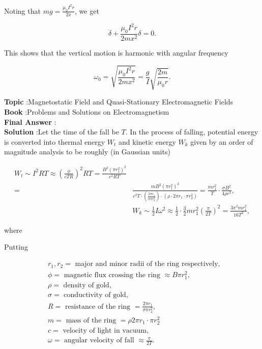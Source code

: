 \documentclass[10pt]{article}
\begin{document}
Noting that $m g=\frac{\mu_{0} I^{2} r}{2 x}$, we get

$$
\ddot{\delta}+\frac{\mu_{0} I^{2} r}{2 m x^{2}} \delta=0 .
$$

This shows that the vertical motion is harmonic with angular frequency

$$
\omega_{0}=\sqrt{\frac{\mu_{0} I^{2} r}{2 m x^{2}}}=\frac{g}{I} \sqrt{\frac{2 m}{\mu_{0} r}} .
$$

\textbf{Topic} :Magnetostatic Field and Quasi-Stationary Electromagnetic Fields\\
\textbf{Book} :Problems and Solutions on Electromagnetism\\
\textbf{Final Answer} : \\


\textbf{Solution} :Let the time of the fall be $T$. In the process of falling, potential energy is converted into thermal energy $W_{t}$ and kinetic energy $W_{k}$ given by an order of magnitude analysis to be roughly (in Gaussian units)

$$
\begin{aligned}
W_{t} \sim I^{2} R T \approx\left(\frac{\phi}{c T R}\right)^{2} R T=\frac{B^{2}\left(\pi r_{1}^{2}\right)^{2}}{c^{2} R T} \\
=& \frac{m B^{2}\left(\pi r_{1}^{2}\right)^{2}}{c^{2} T \cdot\left(\frac{2 \pi r_{1}}{\sigma \pi r_{2}^{2}}\right) \cdot\left(\rho \cdot 2 \pi r_{1} \cdot \pi r_{2}^{2}\right)}=\frac{m r_{1}^{2}}{T} \cdot \frac{\sigma B^{2}}{4 \rho c^{2}}, \\
& W_{k} \sim \frac{1}{2} I \omega^{2} \approx \frac{1}{2} \cdot \frac{3}{2} m r_{1}^{2}\left(\frac{\pi}{2 T}\right)^{2}=\frac{3 \pi^{2} m r_{1}^{2}}{16 T^{2}},
\end{aligned}
$$

where

Putting

$$
\begin{aligned}
&r_{1}, r_{2}=\text { major and minor radii of the ring respectively, } \\
&\phi=\text { magnetic flux crossing the ring } \approx B \pi r_{1}^{2}, \\
&\rho=\text { density of gold, } \\
&\sigma=\text { conductivity of gold, } \\
&R=\text { resistance of the ring }=\frac{2 \pi r_{1}}{\sigma \pi r_{2}^{2}}, \\
&m=\text { mass of the ring }=\rho 2 \pi r_{1} \cdot \pi r_{2}^{2} \\
&c=\text { velocity of light in vacuum, } \\
&\omega=\text { angular velocity of fall } \approx \frac{\pi}{2 T} .
\end{aligned}
$$
\end{document}
